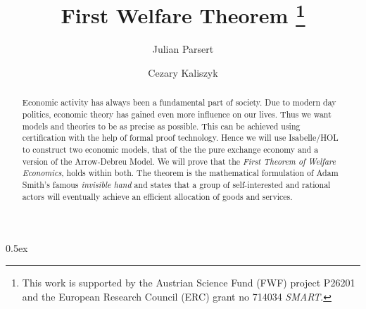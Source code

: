 \documentclass[11pt,a4paper]{article}
\begin{document}
\title{First Welfare Theorem \thanks{%
This work is supported by the Austrian Science Fund (FWF) project P26201 and the European Research Council (ERC) grant no 714034 \emph{SMART}.}}

\author{Julian Parsert \and Cezary Kaliszyk}

\maketitle

\begin{abstract}
  Economic activity has always been a fundamental part of society.
  Due to modern day politics, economic theory has gained even more
  influence on our lives. Thus we want models and theories to be as
  precise as possible. This can be achieved using
  certification with the help of formal proof technology. Hence we
  will use Isabelle/HOL to construct two economic models, that of the the pure
  exchange economy and a version of the Arrow-Debreu Model. We will
  prove that the \emph{First Theorem of Welfare Economics}, holds
  within both. The theorem is the mathematical formulation of Adam
  Smith's famous \emph{invisible hand} and states that a group of
  self-interested and rational actors will eventually achieve an
  efficient allocation of goods and services.
\end{abstract}

\tableofcontents

\parindent 0pt\parskip 0.5ex

\end{document}
